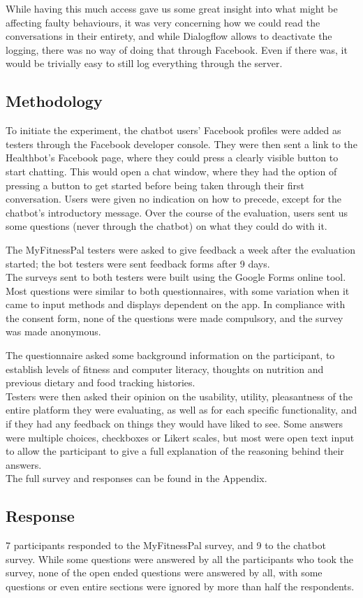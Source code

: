 While having this much access gave us some great insight into what might be affecting faulty behaviours, it was very concerning how we could read the conversations in their entirety, and while Dialogflow allows to deactivate the logging, there was no way of doing that through Facebook. Even if there was, it would be trivially easy to still log everything through the server.
\subsection{Methodology}
To initiate the experiment, the chatbot users' Facebook profiles were added as testers through the Facebook developer console. They were then sent a link to the Healthbot's Facebook page, where they could press a clearly visible button to start chatting. This would open a chat window, where they had the option of pressing a button to get started before being taken through their first conversation. Users were given no indication on how to precede, except for the chatbot's introductory message. Over the course of the evaluation, users sent us some questions (never through the chatbot) on what they could do with it. 

The MyFitnessPal testers were asked to give feedback a week after the evaluation started; the bot testers were sent feedback forms after 9 days.\\
The surveys sent to both testers were built using the Google Forms online tool. Most questions were similar to both questionnaires, with some variation when it came to input methods and displays dependent on the app. In compliance with the consent form, none of the questions were made compulsory, and the survey was made anonymous.

The questionnaire asked some background information on the participant, to establish levels of fitness and computer literacy, thoughts on nutrition and previous dietary and food tracking histories.\\
Testers were then asked their opinion on the usability, utility, pleasantness of the entire platform they were evaluating, as well as for each specific functionality, and if they had any feedback on things they would have liked to see. Some answers were multiple choices, checkboxes or Likert scales, but most were open text input to allow the participant to give a full explanation of the reasoning behind their answers.\\
The full survey and responses can be found in the Appendix.
\subsection{Response}
7 participants responded to the MyFitnessPal survey, and 9 to the chatbot survey. While some questions were answered by all the participants who took the survey, none of the open ended questions were answered by all, with some questions or even entire sections were ignored by more than half the respondents. 

